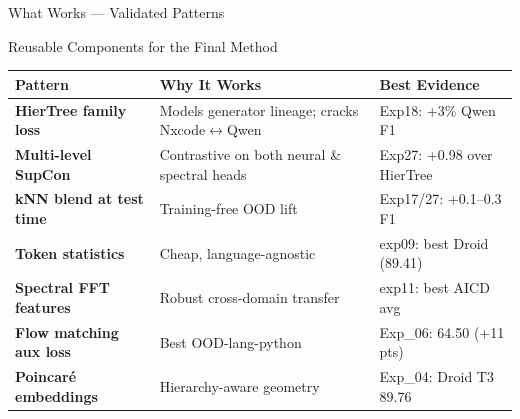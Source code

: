 \documentclass[aspectratio=169, 10pt]{beamer}
\begin{document}
\begin{frame}{What Works --- Validated Patterns}
\vspace{-0.15cm}
\begin{block}{Reusable Components for the Final Method}
\small
\renewcommand{\arraystretch}{1.1}
\begin{tabular}{@{}p{4.2cm}p{4.5cm}p{3.5cm}@{}}
\toprule
\textbf{Pattern} & \textbf{Why It Works} & \textbf{Best Evidence} \\
\midrule
\textbf{HierTree family loss} & Models generator lineage; cracks Nxcode$\leftrightarrow$Qwen & Exp18: +3\% Qwen F1 \\
\textbf{Multi-level SupCon} & Contrastive on both neural \& spectral heads & Exp27: +0.98 over HierTree \\
\textbf{kNN blend at test time} & Training-free OOD lift & Exp17/27: +0.1--0.3 F1 \\
\textbf{Token statistics} & Cheap, language-agnostic & exp09: best Droid (89.41) \\
\textbf{Spectral FFT features} & Robust cross-domain transfer & exp11: best AICD avg \\
\textbf{Flow matching aux loss} & Best OOD-lang-python & Exp\_06: 64.50 (+11 pts) \\
\textbf{Poincar\'{e} embeddings} & Hierarchy-aware geometry & Exp\_04: Droid T3 89.76 \\
\bottomrule
\end{tabular}
\end{block}

\vspace{0.1cm}
\centering
{}
\end{frame}
\end{document}

